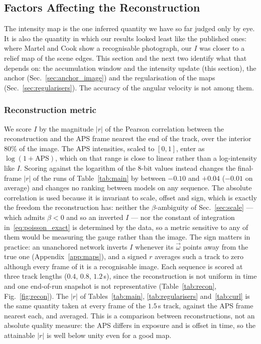 \documentclass[journal]{IEEEtran}
\newcommand{\Imap}{I}
\newcommand{\wvec}{\vec{\omega}}
\begin{document}
\subsection{Factors Affecting the Reconstruction}
\label{sec:reconstruction}

The intensity map is the one inferred quantity we have so far judged only by
eye. It is also the quantity in which our results looked least like the
published ones: where Martel and Cook show a recognisable photograph, our
$\Imap$ was closer to a relief map of the scene edges. This section and the
next two identify what that depends on: the accumulation window and the
intensity update (this section), the anchor (Sec.~\ref{sec:anchor_image}) and
the regularisation of the maps (Sec.~\ref{sec:regularisers}). The accuracy of
the angular velocity is not among them.

\subsubsection{Reconstruction metric}
We score $\Imap$ by the magnitude $|r|$ of the Pearson correlation between the
reconstruction and the APS frame nearest the end of the track, over the
interior $80\%$ of the image. The APS intensities, scaled to $[0,1]$, enter as
$\log(1+\text{APS})$, which on that range is close to linear rather than a
log-intensity like $\Imap$. Scoring against the logarithm of the 8-bit values
instead changes the final-frame $|r|$ of the runs of Table~\ref{tab:main} by
between $-0.10$ and $+0.04$ ($-0.01$ on average) and changes no ranking between
models on any sequence. The absolute correlation is used because
it is invariant to scale, offset and sign, which is exactly the freedom the
reconstruction has: neither the $\beta$-ambiguity of Sec.~\ref{sec:scale} ---
which admits $\beta < 0$ and so an inverted $\Imap$ --- nor the constant of
integration in~\eqref{eq:poisson_exact} is determined by the data, so a metric
sensitive to any of them would be measuring the gauge rather than the image.
The sign matters in practice: an unanchored network inverts $\Imap$ whenever
its $\wvec$ points away from the true one (Appendix~\ref{app:maps}), and a
signed $r$ averages such a track to zero although every frame of it is a
recognisable image. Each sequence is scored at three track lengths ($0.4$,
$0.8$, $1.2$\,s), since the reconstruction is not uniform in time and one
end-of-run snapshot is not representative (Table~\ref{tab:recon},
Fig.~\ref{fig:recon}). The $|r|$ of Tables~\ref{tab:main},
\ref{tab:regularisers} and~\ref{tab:curl} is the same quantity taken at every
frame of the $1.5$\,s track, against the APS frame nearest each, and averaged.
This is a comparison between reconstructions, not an absolute quality measure:
the APS differs in exposure and is offset in time, so the attainable $|r|$ is
well below unity even for a good map.
\end{document}
